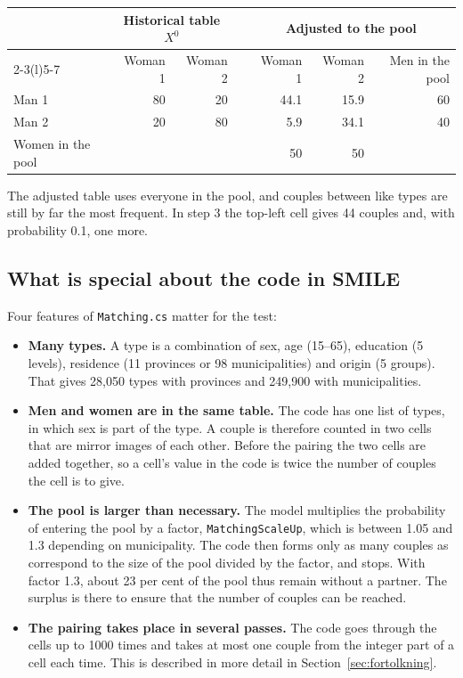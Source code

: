 \documentclass[12pt,a4paper]{article}
\newcommand{\kode}[1]{\texttt{#1}}
\begin{document}
\begin{center}
\begin{tabular}{@{}lrrcrrr@{}}
\toprule
 & \multicolumn{2}{c}{Historical table $X^0$} & & \multicolumn{3}{c}{Adjusted to the pool} \\
\cmidrule(lr){2-3}\cmidrule(l){5-7}
 & Woman 1 & Woman 2 & & Woman 1 & Woman 2 & Men in the pool \\
\midrule
Man 1 & 80 & 20 & & 44.1 & 15.9 & 60 \\
Man 2 & 20 & 80 & & 5.9 & 34.1 & 40 \\
\midrule
Women in the pool & & & & 50 & 50 & \\
\bottomrule
\end{tabular}
\end{center}

The adjusted table uses everyone in the pool, and couples between like types are still by far the
most frequent. In step 3 the top-left cell gives 44 couples and, with probability 0.1, one more.

\subsection{What is special about the code in SMILE}

Four features of \kode{Matching.cs} matter for the test:

\begin{itemize}
\item \textbf{Many types.} A type is a combination of sex, age (15--65), education (5 levels),
residence (11 provinces or 98 municipalities) and origin (5 groups). That gives 28,050 types with
provinces and 249,900 with municipalities.

\item \textbf{Men and women are in the same table.} The code has one list of types, in which sex is
part of the type. A couple is therefore counted in two cells that are mirror images of each other.
Before the pairing the two cells are added together, so a cell's value in the code is twice the
number of couples the cell is to give.

\item \textbf{The pool is larger than necessary.} The model multiplies the probability of entering
the pool by a factor, \kode{MatchingScaleUp}, which is between 1.05 and 1.3 depending on
municipality. The code then forms only as many couples as correspond to the size of the pool divided
by the factor, and stops. With factor 1.3, about 23 per cent of the pool thus remain without a
partner. The surplus is there to ensure that the number of couples can be reached.

\item \textbf{The pairing takes place in several passes.} The code goes through the cells up to 1000
times and takes at most one couple from the integer part of a cell each time. This is described in
more detail in Section~\ref{sec:fortolkning}.
\end{itemize}
\end{document}
